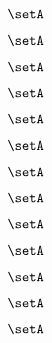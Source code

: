\begin{forslides}
\begin{forslides}
    \begin{equation}
        \label{eq:slides-translation-34}
        \setA
    \end{equation}

    \begin{equation}
        \label{eq:slides-translation-35}
        \setA
    \end{equation}

    \begin{equation}
        \label{eq:slides-translation-36}
        \setA
    \end{equation}

    \begin{equation}
        \label{eq:slides-translation-37}
        \setA
    \end{equation}

    \begin{equation}
        \label{eq:slides-translation-38}
        \setA
    \end{equation}

    \begin{equation}
        \label{eq:slides-translation-39}
        \setA
    \end{equation}

    \begin{equation}
        \label{eq:slides-translation-40}
        \setA
    \end{equation}

    \begin{equation}
        \label{eq:slides-translation-41}
        \setA
    \end{equation}

    \begin{equation}
        \label{eq:slides-translation-42}
        \setA
    \end{equation}

    \begin{equation}
        \label{eq:slides-translation-43}
        \setA
    \end{equation}

    \begin{equation}
        \label{eq:slides-translation-44}
        \setA
    \end{equation}

    \begin{equation}
        \label{eq:slides-translation-45}
        \setA
    \end{equation}

    \begin{equation}
        \label{eq:slides-translation-46}
        \setA
    \end{equation}


\end{forslides}
\end{forslides}
